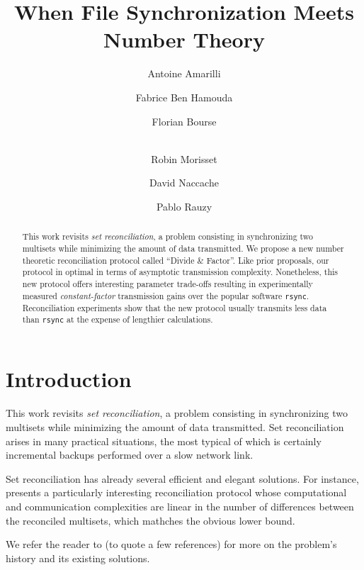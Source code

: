 \documentclass[11pt]{llncs}
\newcommand{\rsync}{\texttt{rsync}\xspace}
\begin{document}
\title{When File Synchronization Meets Number Theory}

\author{Antoine Amarilli \and Fabrice Ben Hamouda \and Florian Bourse \and\\
Robin Morisset \and David Naccache \and Pablo Rauzy}


\maketitle

\begin{abstract}
This work revisits {\sl set reconciliation}, a problem consisting in
synchronizing two multisets while minimizing the amount of data transmitted. We
propose a new number theoretic reconciliation protocol called ``Divide \&
Factor''. Like prior proposals, our protocol in optimal in terms of asymptotic
transmission complexity. Nonetheless, this new protocol offers interesting
parameter trade-offs resulting in experimentally measured {\sl constant-factor}
transmission gains over the popular software \rsync. Reconciliation experiments
show that the new protocol usually transmits less data than \rsync at the
expense of lengthier calculations.\smallskip
\end{abstract}

\section{Introduction}
This work revisits {\sl set reconciliation}, a problem consisting in
synchronizing two multisets while minimizing the amount of data transmitted. Set
reconciliation arises in many practical situations, the most typical of which is
certainly incremental backups performed over a slow network link.\smallskip

Set reconciliation has already several efficient and elegant solutions. For
instance, \cite{PSRec} presents a particularly interesting reconciliation
protocol whose computational and communication complexities are linear in the
number of differences between the reconciled multisets, which mathches the
obvious lower bound.\smallskip

We refer the reader to \cite{PSRec,Mins1,Whats} (to quote a few references) for more on the problem's history and its existing solutions.\smallskip
\end{document}
